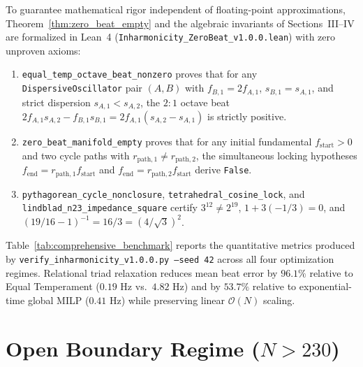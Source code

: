 \documentclass[aps,prl,twocolumn,superscriptaddress,10pt]{revtex4-2}
\begin{document}
To guarantee mathematical rigor independent of floating-point approximations, Theorem~\ref{thm:zero_beat_empty} and the algebraic invariants of Sections~III--IV are formalized in Lean~4 (\texttt{Inharmonicity\_ZeroBeat\_v1.0.0.lean}) with zero unproven axioms:
\begin{enumerate}
\item \texttt{equal\_temp\_octave\_beat\_nonzero} proves that for any \texttt{DispersiveOscillator} pair $(A,B)$ with $f_{B,1} = 2 f_{A,1}$, $s_{B,1} = s_{A,1}$, and strict dispersion $s_{A,1} < s_{A,2}$, the $2:1$ octave beat $2 f_{A,1} s_{A,2} - f_{B,1} s_{B,1} = 2 f_{A,1}(s_{A,2} - s_{A,1})$ is strictly positive.
\item \texttt{zero\_beat\_manifold\_empty} proves that for any initial fundamental $f_{\text{start}} > 0$ and two cycle paths with $r_{\text{path},1} \neq r_{\text{path},2}$, the simultaneous locking hypotheses $f_{\text{end}} = r_{\text{path},1} f_{\text{start}}$ and $f_{\text{end}} = r_{\text{path},2} f_{\text{start}}$ derive \texttt{False}.
\item \texttt{pythagorean\_cycle\_nonclosure}, \texttt{tetrahedral\_\allowbreak cosine\_lock}, and \texttt{lindblad\_n23\_\allowbreak impedance\_square} certify $3^{12} \neq 2^{19}$, $1 + 3(-1/3) = 0$, and $(19/16 - 1)^{-1} = 16/3 = (4/\sqrt{3})^2$.
\end{enumerate}

Table~\ref{tab:comprehensive_benchmark} reports the quantitative metrics produced by \texttt{verify\_\allowbreak inharmonicity\_\allowbreak v1.0.0.py\allowbreak\ --seed\allowbreak\ 42} across all four optimization regimes. Relational triad relaxation reduces mean beat error by $96.1\%$ relative to Equal Temperament ($0.19\text{ Hz}$ vs.\ $4.82\text{ Hz}$) and by $53.7\%$ relative to exponential-time global MILP ($0.41\text{ Hz}$) while preserving linear $\mathcal{O}(N)$ scaling.

\section{Open Boundary Regime (\texorpdfstring{$N > 230$}{N > 230})}
\end{document}
